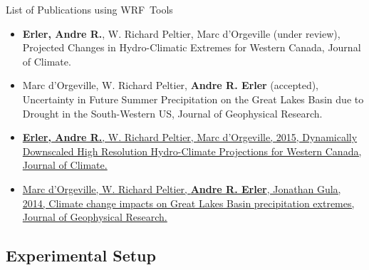 \documentclass[hyperref={pdfpagelabels=false},compress,final]{beamer}
\begin{document}
\begin{frame}{\Large List of Publications using WRF~Tools}
  \medskip
  \begin{itemize}
    \scriptsize
    \item \textbf{Erler, Andre R.}, W. Richard Peltier, Marc d'Orgeville (under review),
    Projected Changes in Hydro-Climatic Extremes for Western Canada,
    Journal of Climate. \bigskip

    \item Marc d'Orgeville, W. Richard Peltier, \textbf{Andre R. Erler} (accepted),
    Uncertainty in Future Summer Precipitation on the Great Lakes Basin due to Drought in the South-Western US,
    Journal of Geophysical Research. \bigskip

    \item \href{http://journals.ametsoc.org/doi/abs/10.1175/JCLI-D-14-00174.1}
    {\textbf{Erler, Andre R.}, W. Richard Peltier, Marc d'Orgeville, 2015,
      Dynamically Downscaled High Resolution Hydro-Climate Projections for Western Canada,
      Journal of Climate.} \bigskip

    \item \href{http://onlinelibrary.wiley.com/enhanced/doi/10.1002/2014JD021855/}
    {Marc d'Orgeville, W. Richard Peltier, \textbf{Andre R. Erler}, Jonathan Gula, 2014,
      Climate change impacts on Great Lakes Basin precipitation extremes,
      Journal of Geophysical Research.} \bigskip
  \end{itemize}

\end{frame}




\appendix

\subsection*{Experimental Setup}
\end{document}
